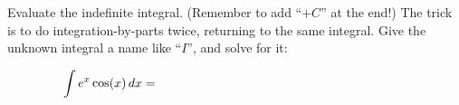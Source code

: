 Evaluate the indefinite integral.  (Remember to add ``$+C$'' at the end!)  The trick is to do integration-by-parts twice, returning to the same integral.  Give the unknown integral a name like ``$I$'', and solve for it:

$$\int e^x \cos(x)\,dx = \hspace{70mm}$$
